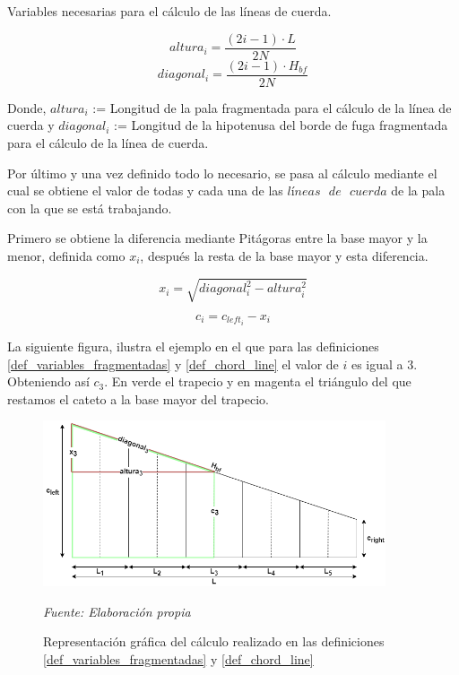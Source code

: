 \begin{definicion}
Variables necesarias para el cálculo de las líneas de cuerda.

$$ altura_i = \dfrac{(2i - 1) \cdot L}{2N}$$
$$ diagonal_i = \dfrac{(2i - 1) \cdot H_{bf}}{2N}$$

Donde,
\centering
$altura_i$ := Longitud de la pala fragmentada para el cálculo de la línea de cuerda y $diagonal_i$ := Longitud de la hipotenusa del borde de fuga fragmentada para el cálculo de la línea de cuerda.
\label{def_variables_fragmentadas}
\end{definicion}

Por último y una vez definido todo lo necesario, se pasa al cálculo mediante el cual se obtiene el valor de todas y cada una de las $líneas \text{ } de \text{ } cuerda$ de la pala con la que se está trabajando.

\begin{definicion}
Primero se obtiene la diferencia mediante Pitágoras entre la base mayor y la menor, definida como $x_i$, después la resta de la base mayor y esta diferencia.

$$ x_i = \sqrt{diagonal_i^{2} - altura_i^{2}}$$

$$ c_i = c_{left_i} - x_i $$
\label{def_chord_line}
\end{definicion}

La siguiente figura, ilustra el ejemplo en el que para las definiciones \ref{def_variables_fragmentadas} y \ref{def_chord_line} el valor de $i$ es igual a 3. Obteniendo así $c_3$. En verde el trapecio y en magenta el triángulo del que restamos el cateto a la base mayor del trapecio.

\begin{figure}[H]
    \centering
    \includegraphics[width=0.9\textwidth]{images/Trapecio calculo x.png}
    \caption{Representación gráfica del cálculo realizado en las definiciones \ref{def_variables_fragmentadas} y \ref{def_chord_line}}
    \textit{Fuente: Elaboración propia}
    \label{fig:pala_calculo_phi}
\end{figure}


